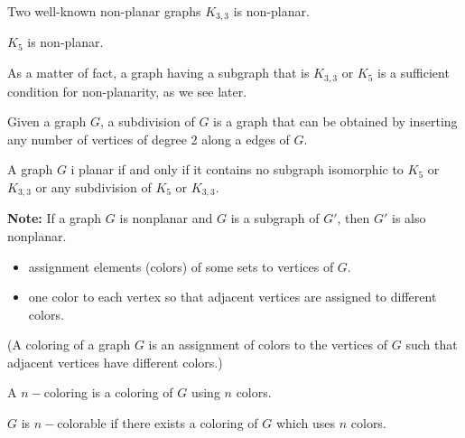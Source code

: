 \documentclass[aspectratio=169]{beamer}
\begin{document}
\begin{frame}{Two well-known non-planar graphs}
$K_{3,3}$ is non-planar.

$K_5$ is non-planar.

As a matter of fact, a graph having a subgraph that is $K_{3,3}$ or $K_5$ is a sufficient condition for non-planarity, as we see later.
\end{frame}


\begin{frame}
\begin{definition}[{Subdivision of $G$}]
Given a graph $G$, a subdivision of $G$ is a graph that can be obtained by inserting any number of vertices of degree 2 along a edges of $G$.
\end{definition}
\begin{theorem}
A graph $G$ i planar if and only if it contains no subgraph isomorphic to $K_5$ or $K_{3,3}$ or any subdivision of $K_5$ or $K_{3,3}$.
\end{theorem}
{\bf Note:} If a graph $G$ is nonplanar and $G$ is a subgraph of $G'$, then $G'$ is also nonplanar.
\end{frame}


\begin{frame}
\begin{definition}
\begin{itemize}
\item assignment elements (colors) of some sets to vertices of $G$.
\item one color to each vertex so that adjacent vertices are assigned to different colors.
\end{itemize}
(A coloring of a graph $G$ is an assignment of colors to the vertices of $G$ such that adjacent vertices have different colors.)
\end{definition}

\begin{definition}[{$n-$coloring of $G$}]
A $n-$coloring is a coloring of $G$ using $n$ colors.
\end{definition}

\begin{definition}[{$n-$colorable}]
$G$ is $n-$colorable if there exists a coloring of
$G$ which uses $n$ colors.
\end{definition}
\end{frame}
\end{document}
